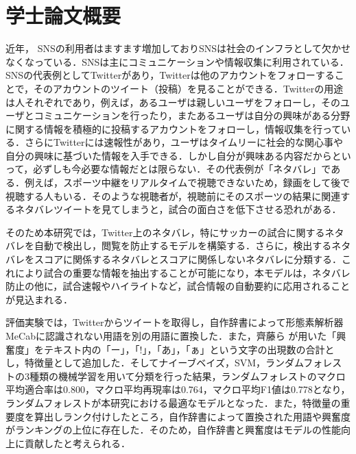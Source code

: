 \chapter*{学士論文概要}
近年， SNSの利用者はますます増加しておりSNSは社会のインフラとして欠かせなくなっている．SNSは主にコミュニケーションや情報収集に利用されている．SNSの代表例としてTwitterがあり，Twitterは他のアカウントをフォローすることで，そのアカウントのツイート（投稿）を見ることができる．Twitterの用途は人それぞれであり，例えば，あるユーザは親しいユーザをフォローし，そのユーザとコミュニケーションを行ったり，またあるユーザは自分の興味がある分野に関する情報を積極的に投稿するアカウントをフォローし，情報収集を行っている．さらにTwitterには速報性があり，ユーザはタイムリーに社会的な関心事や自分の興味に基づいた情報を入手できる．しかし自分が興味ある内容だからといって，必ずしも今必要な情報だとは限らない．その代表例が「ネタバレ」である．例えば，スポーツ中継をリアルタイムで視聴できないため，録画をして後で視聴する人もいる．そのような視聴者が，視聴前にそのスポーツの結果に関連するネタバレツイートを見てしまうと，試合の面白さを低下させる恐れがある．

そのため本研究では，Twitter上のネタバレ，特にサッカーの試合に関するネタバレを自動で検出し，閲覧を防止するモデルを構築する．さらに，検出するネタバレをスコアに関係するネタバレとスコアに関係しないネタバレに分類する．これにより試合の重要な情報を抽出することが可能になり，本モデルは，ネタバレ防止の他に，試合速報やハイライトなど，試合情報の自動要約に応用されることが見込まれる．


評価実験では，Twitterからツイートを取得し，自作辞書によって形態素解析器MeCabに認識されない用語を別の用語に置換した．また，齊藤ら \cite{齊藤}が用いた「興奮度」をテキスト内の「ー」，「!」，「あ」，「ぁ」という文字の出現数の合計とし，特徴量として追加した．そしてナイーブベイズ，SVM，ランダムフォレストの3種類の機械学習を用いて分類を行った結果，ランダムフォレストのマクロ平均適合率は0.800，マクロ平均再現率は0.764，マクロ平均F1値は0.778となり，ランダムフォレストが本研究における最適なモデルとなった．また，特徴量の重要度を算出しランク付けしたところ，自作辞書によって置換された用語や興奮度がランキングの上位に存在した．そのため，自作辞書と興奮度はモデルの性能向上に貢献したと考えられる．%